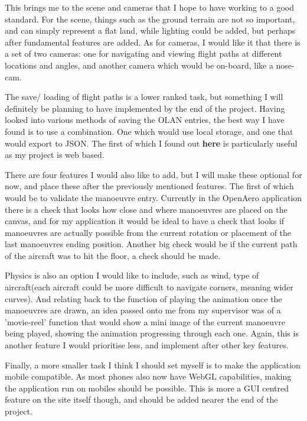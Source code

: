 This brings me to the scene and cameras that I hope to have working to a good standard. For the scene, things such as the ground terrain are not so important, and can simply represent a flat land, while lighting could be added, but perhaps after fundamental features are added. As for cameras, I would like it that there is a set of two cameras: one for navigating and viewing flight paths at different locations and angles, and another camera which would be on-board, like a nose-cam.

The save/ loading of flight paths is a lower ranked task, but something I will definitely be planning to have implemented by the end of the project. Having looked into various methods of saving the OLAN entries, the best way I have found is to use a combination. One which would use local storage, and one that would export to JSON. The first of which I found out \textbf{here} is particularly useful as my project is web based.

There are four features I would also like to add, but I will make these optional for now, and place these after the previously mentioned features. The first of which would be to validate the manoeuvre entry. Currently in the OpenAero application there is a check that looks how close and where manoeuvres are placed on the canvas, and for my application it would be ideal to have a check that looks if manoeuvres are actually possible from the current rotation or placement of the last manoeuvres ending position. Another big check would be if the current path of the aircraft was to hit the floor, a check should be made.

Physics is also an option I would like to include, such as wind, type of aircraft(each aircraft could be more difficult to navigate corners, meaning wider curves). And relating back to the function of playing the animation once the manoeuvres are drawn, an idea passed onto me from my supervisor was of a 'movie-reel' function that would show a mini image of the current manoeuvre being played, showing the animation progressing through each one. Again, this is another feature I would prioritise less, and implement after other key features.

Finally, a more smaller task I think I should set myself is to make the application mobile compatible. As most phones also now have WebGL capabilities, making the application run on mobiles should be possible. This is more a GUI centred feature on the site itself though, and should be added nearer the end of the project.

